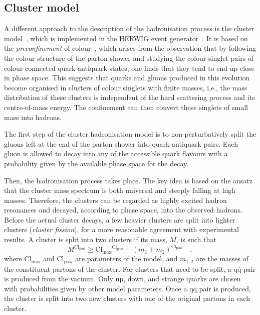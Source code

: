 \subsection{Cluster model}
A different approach to the description of the hadronisation process is the cluster model~\cite{Webber:1983if}, which is implemented in the HERWIG event generator~\cite{Bahr:2008pv}. It is based on the \emph{preconfinement} of colour~\cite{Amati:1979fg}, which arises from the observation that by following the colour structure of the parton shower and studying the colour-singlet pairs of colour-connected quark-antiquark states, one finds that they tend to end up close in phase space. This suggests that quarks and gluons produced in this evolution become organised in clusters of colour singlets with finite masses, i.e., the mass distribution of these clusters is independent of the hard scattering process and its centre-of-mass energy. The confinement can then convert these singlets of small mass into hadrons. 

The first step of the cluster hadronisation model is to non-perturbatively split the gluons left at the end of the parton shower into quark-antiquark pairs. Each gluon is allowed to decay into any of the accessible quark flavours with a probability given by the available phase space for the decay. 

Then, the hadronisation process takes place. The key idea is based on the ansatz that the cluster mass spectrum is both universal and steeply falling at high masses. Therefore, the clusters can be regarded as highly excited hadron resonances and decayed, according to phase space, into the observed hadrons. Before the actual cluster decays, a few heavier clusters are split into lighter clusters (\emph{cluster fission}), for a more reasonable agreement with experimental results. A cluster is split into two clusters if its mass, $M$, is such that
\begin{equation*}
    M^{\mathrm{Cl_{pow}}} \geq \mathrm{Cl_{max} {}^{Cl_{pow}}} + (m_1+m_2)^{\mathrm{Cl_{pow}}}\quad ,
\end{equation*}
where $\mathrm{Cl_{max}}$ and $\mathrm{Cl_{pow}}$ are parameters of the model, and $m_{1,2}$ are the masses of the constituent partons of the cluster. For clusters that need to be split, a $\mathrm{q\overline{q}}$ pair is produced from the vacuum. Only up, down, and strange quarks are chosen with probabilities given by other model parameters. Once a $\mathrm{q\overline{q}}$ pair is produced, the cluster is split into two new clusters with one of the original partons in each cluster. 

